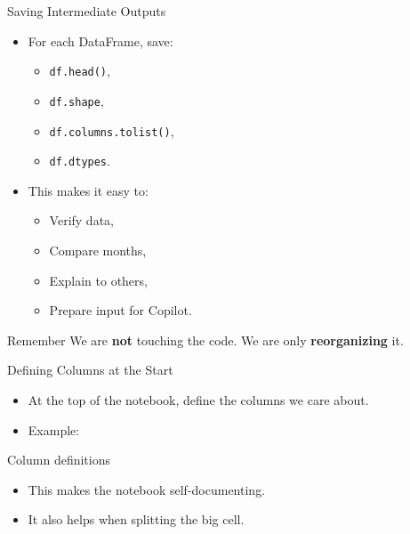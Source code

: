 \documentclass[aspectratio=169,11pt]{beamer}
\begin{document}
	\begin{frame}{Saving Intermediate Outputs}
		\begin{itemize}
			\item For each DataFrame, save:
			\begin{itemize}
				\item \texttt{df.head()},
				\item \texttt{df.shape},
				\item \texttt{df.columns.tolist()},
				\item \texttt{df.dtypes}.
			\end{itemize}
			\item This makes it easy to:
			\begin{itemize}
				\item Verify data,
				\item Compare months,
				\item Explain to others,
				\item Prepare input for Copilot.
			\end{itemize}
		\end{itemize}
		
		\begin{block}{Remember}
			We are \textbf{not} touching the code. We are only \textbf{reorganizing} it.
		\end{block}
	\end{frame}
	
\begin{frame}{Defining Columns at the Start}
	
	\begin{itemize}
		\item At the top of the notebook, define the columns we care about.
		\item Example:
	\end{itemize}
	
	\begin{block}{Column definitions}
		\small
		\texttt{\detokenize{KEY_COLUMNS = [}}
		\par
		\texttt{}
		\par
		\texttt{}
		\par
		\texttt{}
		\par
		\texttt{}
		\par
		\texttt{\detokenize{]}}
		\par
		\vspace{0.1cm}
		\texttt{}
	\end{block}
	
	\begin{itemize}
		\item This makes the notebook self-documenting.
		\item It also helps when splitting the big cell.
	\end{itemize}
	
\end{frame}
	
\end{document}
